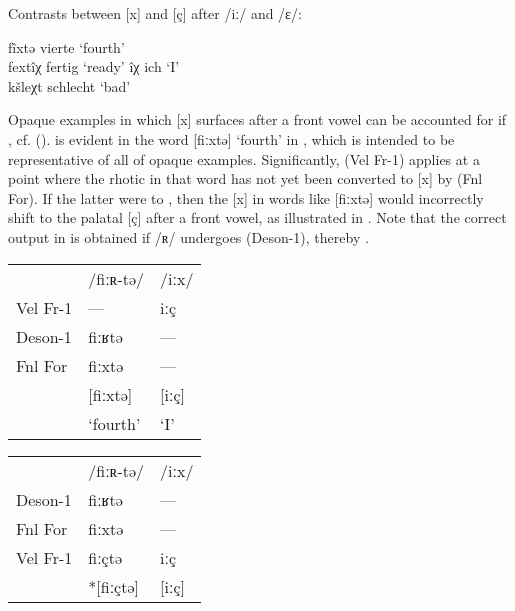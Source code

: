 \ea%
\label{ex:5:31}Contrasts between [x] and [ç] after /iː/ and /ɛ/:

\ea\label{ex:5:31a} fîxtə  \tab [fiːxtə]  \tab vierte   \tab ‘fourth’\\
    fextîχ \tab [fɛxtiːç] \tab fertig   \tab ‘ready’
\ex\label{ex:5:31b} îχ     \tab [iːç]     \tab ich      \tab ‘I’\\
    kšleχt \tab [kʃlɛçt]  \tab schlecht \tab ‘bad’
\z
\z 

Opaque examples in which [x] surfaces after a front vowel can be accounted for if   , cf.  ().   is evident in the word [fiːxtə] ‘fourth’ in , which is intended to be representative of all of opaque examples. Significantly,  (Vel Fr-1) applies at a point where the rhotic in that word has not yet been converted to [x] by  (Fnl For). If the latter were to  , then the [x] in words like [fiːxtə] would incorrectly shift to the palatal [ç] after a front vowel, as illustrated in . Note that the correct output in  is obtained if /ʀ/ undergoes  (Deson-1), thereby  .

\ea
 \label{ex:5:32} 
 \begin{multicols}{2}\raggedcolumns
 \ea\label{ex:5:32a} \begin{tabular}[t]{@{}lll@{}}
          & /fiːʀ-tə/        & /iːx/          \\
Vel Fr-1  &  ---             & iːç            \\
Deson-1   & fiːʁtə           & ---\\ 
Fnl For   & fiːxtə           & ---\\ 
          & [fiːxtə]         & [iːç]          \\
          & ‘fourth’         & ‘I’            \\
    \end{tabular}
\ex\label{ex:5:32b} \begin{tabular}[t]{@{}lll@{}}
           & /fiːʀ-tə/     &      /iːx/     \\
  Deson-1  & fiːʁtə        & ---\\
  Fnl For  & fiːxtə        & ---\\
  Vel Fr-1 &  fiːçtə       &   iːç          \\
           &    *[fiːçtə]  &        [iːç]   \\
    \end{tabular}
   \z
   \end{multicols}
\z 


